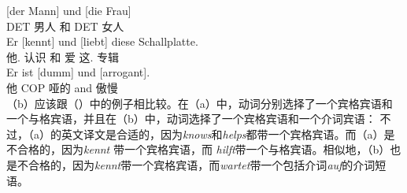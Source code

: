 \eal
\ex 
\gll {}[der Mann] und [die Frau]\\
	 {}\spacebr{}DET 男人 和 \spacebr{}DET 女人\\
\ex 
\gll Er [kennt] und [liebt] diese Schallplatte.\\
	 他.\nom{} \spacebr{}认识 和 \spacebr{}爱 这.\acc{} 专辑\\
\ex 
\gll Er ist [dumm] und [arrogant].\\
	他 COP \spacebr{}哑的 and \spacebr{}傲慢\\
\zl
（b）应该跟（）中的例子相比较。在（a）中，动词分别选择了一个宾格宾语和一个与格宾语，并且在（b）中，动词选择了一个宾格宾语和一个介词宾语：
\eal
{}
\zl
不过，（a）的英文译文是合适的，因为\emph{knows}和\emph{helps}都带一个宾格宾语。而（a）是不合格的，因为\emph{kennt} 带一个宾格宾语，而 \emph{hilft}带一个与格宾语。相似地，（b）也是不合格的，因为\emph{kennt}带一个宾格宾语，而\emph{wartet}带一个包括介词\emph{auf}的介词短语。


